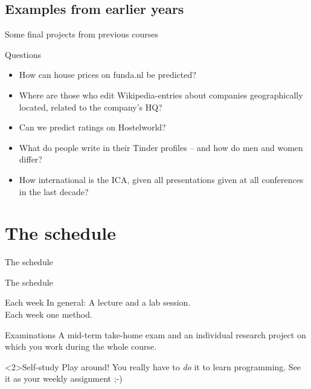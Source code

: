 \documentclass{beamer}
\begin{document}
\subsection{Examples from earlier years}
\begin{frame}{Some final projects from previous courses}
\begin{block}{Questions}
\begin{itemize}
\item How can house prices on funda.nl be predicted?
\item Where are those who edit Wikipedia-entries about companies geographically located, related to the company's HQ?
\item Can we predict ratings on Hostelworld?
\item What do people write in their Tinder profiles -- and how do men and women differ?
\item How international is the ICA, given all presentations given at all conferences in the last decade?
\end{itemize}
\end{block}

\end{frame}




\section{The schedule}
\begin{frame}
The schedule
\end{frame}

\begin{frame}{The schedule}
\begin{block}{Each week}
In general: A lecture and a lab session. \\ Each week one method.
\end{block}
\begin{block}{Examinations}
A mid-term take-home exam and an individual research project on which you work during the whole course.
\end{block}


\begin{alertblock}<2>{Self-study}
Play around! You really have to \emph{do} it to learn programming. See it as your weekly assignment ;-)
\end{alertblock}
\end{frame}
\end{document}
